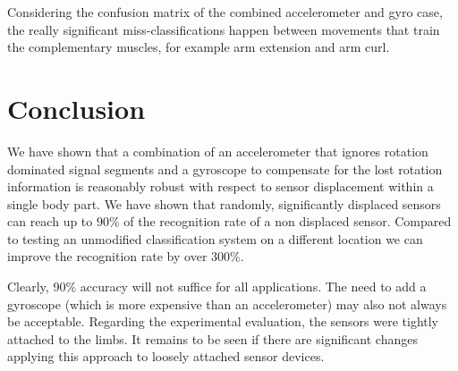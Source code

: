 \begin{table}
\centering
\caption[Confusion matrix 2 Sensors]{ Confusion Matrix Joint Accleerometer and Gyro trained on 2 Sensors eval on 2  82  \% decision boundary  at 300 }
\label{table:cmhmm}
\end{table}
Considering the confusion matrix of the combined accelerometer and gyro case, the really 
significant miss-classifications happen between movements that train
the complementary muscles, for example arm extension and arm curl. 

\section{Conclusion}
We have shown that a combination of an accelerometer that ignores
rotation dominated signal segments  and a gyroscope to compensate for
the lost rotation information is reasonably robust with respect to
sensor displacement within a single body part. We 
have shown that randomly, significantly displaced sensors  can
reach up to 90\% of the recognition rate of a non displaced
sensor. Compared to testing an unmodified classification system on a
different location we can improve the
recognition rate by over 300\%.

Clearly, 90\% accuracy will not suffice for all applications. The need to add a
gyroscope (which is more expensive than an accelerometer) may
 also not always be acceptable. Regarding the experimental evaluation,
the sensors were tightly attached to the limbs. It remains to 
be seen if there are significant changes applying this 
approach to loosely attached sensor devices.
 

